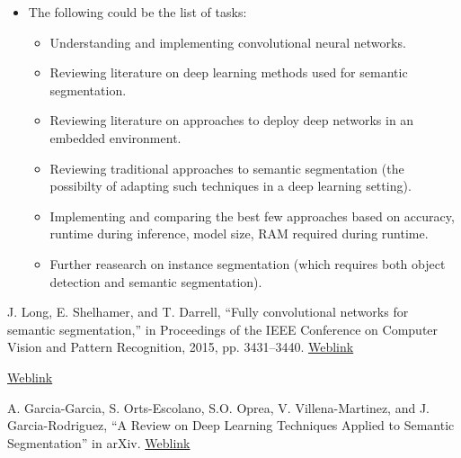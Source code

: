 \documentclass[14pt]{extarticle}
\begin{document}
\begin{itemize}
\item The following could be the list of tasks:
\begin{itemize}

\item Understanding and implementing convolutional neural networks.
\item Reviewing literature on deep learning methods used for semantic segmentation.
\item Reviewing literature on approaches to deploy deep networks in an embedded environment.
\item Reviewing traditional approaches to semantic segmentation (the possibilty of adapting such techniques in a deep learning setting).
\item Implementing and comparing the best few approaches based on accuracy, runtime during inference, model size, RAM required during runtime.
\item Further reasearch on instance segmentation (which requires both object detection and semantic segmentation).

\end{itemize}

\end{itemize}


\begin{thebibliography}{9}

J. Long, E. Shelhamer, and T. Darrell, “Fully convolutional networks for semantic segmentation,” in Proceedings of the IEEE
Conference on Computer Vision and Pattern Recognition, 2015, pp.
3431–3440.
\href{https://people.eecs.berkeley.edu/~jonlong/long_shelhamer_fcn.pdf}{Weblink}

 \href{https://github.com/shelhamer/fcn.berkeleyvision.org/blob/master/voc-fcn16s/caffemodel-url}{Weblink}
 
A. Garcia-Garcia, S. Orts-Escolano, S.O. Oprea, V. Villena-Martinez, and J. Garcia-Rodriguez, “A Review on Deep Learning Techniques
Applied to Semantic Segmentation” in arXiv.
\href{https://arxiv.org/abs/1704.06857}{Weblink}

\end{thebibliography}
\end{document}
